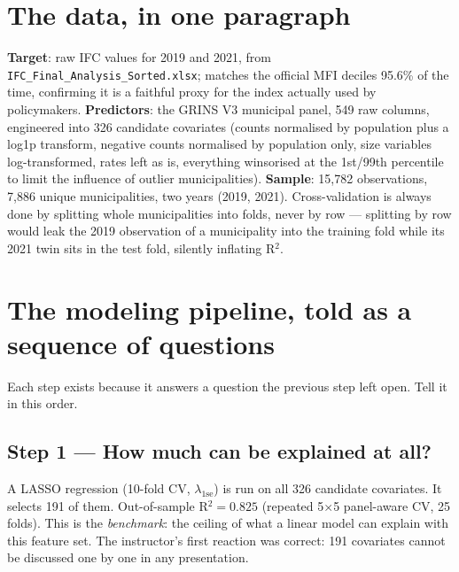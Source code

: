 \documentclass[11pt,a4paper]{article}
\begin{document}
\section{The data, in one paragraph}

\textbf{Target}: raw IFC values for 2019 and 2021, from
\texttt{IFC\_Final\_Analysis\_Sorted.xlsx}; matches the official MFI
deciles 95.6\% of the time, confirming it is a faithful proxy for
the index actually used by policymakers.
\textbf{Predictors}: the GRINS V3 municipal panel, 549 raw columns,
engineered into 326 candidate covariates (counts normalised by
population plus a log1p transform, negative counts normalised by
population only, size variables log-transformed, rates left as is,
everything winsorised at the 1st/99th percentile to limit the
influence of outlier municipalities).
\textbf{Sample}: 15{,}782 observations, 7{,}886 unique
municipalities, two years (2019, 2021). Cross-validation is always
done by splitting whole municipalities into folds, never by row ---
splitting by row would leak the 2019 observation of a municipality
into the training fold while its 2021 twin sits in the test fold,
silently inflating R$^2$.

\section{The modeling pipeline, told as a sequence of questions}

Each step exists because it answers a question the previous step
left open. Tell it in this order.

\subsection*{Step 1 --- How much can be explained at all?}
A LASSO regression (10-fold CV, $\lambda_{\text{1se}}$) is run on
all 326 candidate covariates. It selects 191 of them. Out-of-sample
R$^2 = 0.825$ (repeated 5$\times$5 panel-aware CV, 25 folds). This is
the \emph{benchmark}: the ceiling of what a linear model can explain
with this feature set. The instructor's first reaction was correct:
191 covariates cannot be discussed one by one in any presentation.
\end{document}
